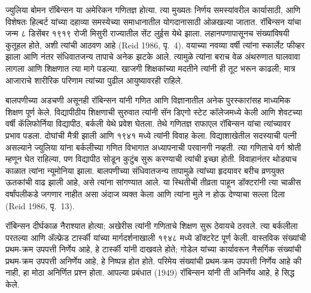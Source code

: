 ज्युलिया बोमन रॉबिन्सन या अमेरिकन गणितज्ञ होत्या. त्या मुख्यतः निर्णय समस्यांवरील कार्यासाठी, आणि विशेषतः हिल्बर्ट यांच्या दहाव्या समस्येच्या समाधानातील योगदानासाठी ओळखल्या जातात. रॉबिन्सन यांचा जन्म ८ डिसेंबर १९१९ रोजी मिसुरी राज्यातील सेंट लुईस येथे झाला. लहानपणापासूनच संख्यांविषयी कुतूहल होते, अशी त्यांची आठवण आहे (Reid 1986, पृ.~4). वयाच्या नवव्या वर्षी त्यांना स्कार्लेट फीव्हर झाला आणि नंतर संधिवातजन्य तापाचे अनेक झटके आले. त्यामुळे त्यांना बराच वेळ अंथरुणात घालवावा लागला आणि शिक्षणात त्या मागे पडल्या. खाजगी शिक्षकांच्या मदतीने त्यांनी ही तूट भरून काढली; मात्र आजाराचे शारीरिक परिणाम त्यांच्या पुढील आयुष्यावरही राहिले.

बालपणीच्या अडचणी असूनही रॉबिन्सन यांनी गणित आणि विज्ञानातील अनेक पुरस्कारांसह माध्यमिक शिक्षण पूर्ण केले. विद्यापीठीय शिक्षणाची सुरुवात त्यांनी सॅन डिएगो स्टेट कॉलेजमध्ये केली आणि शेवटच्या वर्षी कॅलिफोर्निया विद्यापीठ, बर्कली येथे प्रवेश घेतला. तेथे गणितज्ञ राफाएल रॉबिन्सन यांचा त्यांच्यावर प्रभाव पडला. दोघांची मैत्री झाली आणि १९४१ मध्ये त्यांनी विवाह केला. विद्याशाखेतील सदस्याची पत्नी असल्याने ज्युलिया यांना बर्कलीच्या गणित विभागात अध्यापनाची परवानगी नव्हती. त्या गणिताचे वर्ग श्रोती म्हणून घेत राहिल्या, पण विद्यापीठ सोडून कुटुंब सुरू करण्याची त्यांची इच्छा होती. विवाहानंतर थोड्याच काळात त्यांना न्यूमोनिया झाला. बालपणीच्या संधिवातजन्य तापामुळे त्यांच्या हृदयावर बरीच व्रणयुक्त ऊतकांची वाढ झाली आहे, असे त्यांना सांगण्यात आले. या स्थितीची तीव्रता पाहून डॉक्टरांनी त्या चाळीस वर्षांपलीकडे जगणार नाहीत असा अंदाज व्यक्त केला आणि त्यांना मुले न होऊ देण्याचा सल्ला दिला (Reid 1986, पृ.~13).

रॉबिन्सन दीर्घकाळ नैराश्यात होत्या; अखेरीस त्यांनी गणिताचे शिक्षण सुरू ठेवायचे ठरवले. त्या बर्कलीला परतल्या आणि ॲल्फ्रेड टार्स्की यांच्या मार्गदर्शनाखाली १९४८ मध्ये डॉक्टरेट पूर्ण केली. वास्तविक संख्यांची प्रथम-क्रम उपपत्ती निर्णेय आहे, हे टार्स्की यांनी दाखवले होते; गोडेल यांच्या कार्यावरून नैसर्गिक संख्यांची प्रथम-क्रम उपपत्ती अनिर्णेय आहे, हे निष्पन्न होत होते. परिमेय संख्यांची प्रथम-क्रम उपपत्ती निर्णेय आहे की नाही, हा मोठा अनिर्णित प्रश्न होता. आपल्या प्रबंधात (1949) रॉबिन्सन यांनी ती अनिर्णेय आहे, हे सिद्ध केले.

